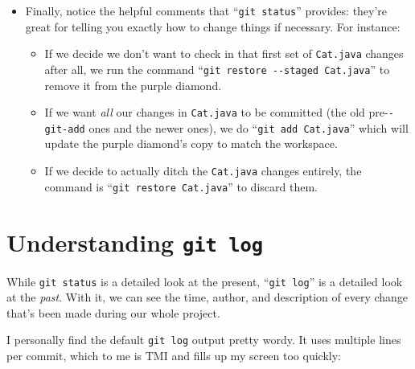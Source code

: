 \begin{itemize}
\item Finally, notice the helpful comments that ``\texttt{git status}''
provides: they're great for telling you exactly how to change things if
necessary. For instance:

\begin{itemize}

\label{gitRestore}
\item If we decide we don't want to check in that first set of
\texttt{Cat.java} changes after all, we run the command ``\texttt{git restore
-{}-staged Cat.java}'' to remove it from the purple diamond.

\item If we want \textit{all} our changes in \texttt{Cat.java} to be committed
(the old pre-\texttt{-git-add} ones and the newer ones), we do ``\texttt{git
add Cat.java}'' which will update the purple diamond's copy to match the
workspace.

\item If we decide to actually ditch the \texttt{Cat.java} changes entirely,
the command is ``\texttt{git restore Cat.java}'' to discard them.

\end{itemize}

\end{itemize}

\section{Understanding \texttt{git log}}

While \texttt{git status} is a detailed look at the present, ``\texttt{git
log}'' is a detailed look at the \textit{past}. With it, we can see the time,
author, and description of every change that's been made during our whole
project.

I personally find the default \texttt{git log} output pretty wordy. It uses
multiple lines per commit, which to me is TMI and fills up my screen too
quickly:

